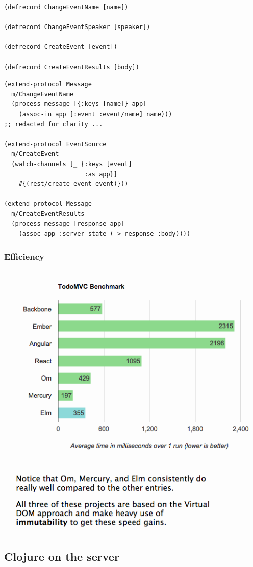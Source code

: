 \documentclass[11pt]{article}
\begin{document}
\begin{verbatim}
(defrecord ChangeEventName [name])

(defrecord ChangeEventSpeaker [speaker])

(defrecord CreateEvent [event])

(defrecord CreateEventResults [body])
\end{verbatim}
\begin{verbatim}
(extend-protocol Message
  m/ChangeEventName
  (process-message [{:keys [name]} app]
    (assoc-in app [:event :event/name] name)))
;; redacted for clarity ...

(extend-protocol EventSource
  m/CreateEvent
  (watch-channels [_ {:keys [event]
                      :as app}]
    #{(rest/create-event event)}))

(extend-protocol Message
  m/CreateEventResults
  (process-message [response app]
    (assoc app :server-state (-> response :body))))
\end{verbatim}

\subsubsection*{Efficiency}
\label{sec:orgheadline21}

\includegraphics[width=.9\linewidth]{./todomvc-perf-comparison.png}

\subsection*{Clojure on the server}
\label{sec:orgheadline23}
\end{document}
